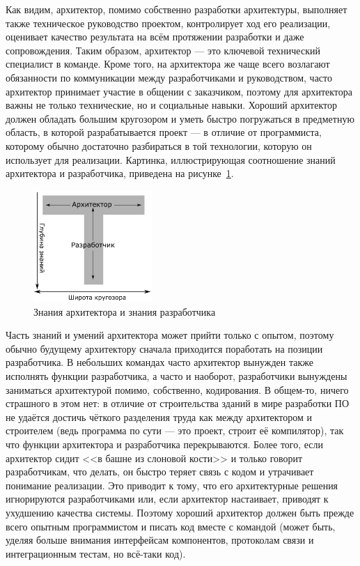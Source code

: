 \documentclass[a5paper]{article}
\begin{document}
Как видим, архитектор, помимо собственно разработки архитектуры, выполняет также техническое руководство проектом, контролирует ход его реализации, оценивает качество результата на всём протяжении разработки и даже сопровождения. Таким образом, архитектор --- это ключевой технический специалист в команде. Кроме того, на архитектора же чаще всего возлагают обязанности по коммуникации между разработчиками и руководством, часто архитектор принимает участие в общении с заказчиком, поэтому для архитектора важны не только технические, но и социальные навыки. Хороший архитектор должен обладать большим кругозором и уметь быстро погружаться в предметную область, в которой разрабатывается проект --- в отличие от программиста, которому обычно достаточно разбираться в той технологии, которую он использует для реализации. Картинка, иллюстрирующая соотношение знаний архитектора и разработчика, приведена на рисунке~\ref{figure:architectVsDeveloper}.

\begin{figure}
    \begin{center}
        \includegraphics[width=0.4\textwidth]{architectVsDeveloper.png}
    \end{center}
    \caption{Знания архитектора и знания разработчика}
    \label{figure:architectVsDeveloper}
\end{figure}

Часть знаний и умений архитектора может прийти только с опытом, поэтому обычно будущему архитектору сначала приходится поработать на позиции разработчика. В небольших командах часто архитектор вынужден также исполнять функции разработчика, а часто и наоборот, разработчики вынуждены заниматься архитектурой помимо, собственно, кодирования. В общем-то, ничего страшного в этом нет: в отличие от строительства зданий в мире разработки ПО не удаётся достичь чёткого разделения труда как между архитектором и строителем (ведь программа по сути --- это проект, строит её компилятор), так что функции архитектора и разработчика перекрываются. Более того, если архитектор сидит <<в башне из слоновой кости>> и только говорит разработчикам, что делать, он быстро теряет связь с кодом и утрачивает понимание реализации. Это приводит к тому, что его архитектурные решения игнорируются разработчиками или, если архитектор настаивает, приводят к ухудшению качества системы. Поэтому хороший архитектор должен быть прежде всего опытным программистом и писать код вместе с командой (может быть, уделяя больше внимания интерфейсам компонентов, протоколам связи и интеграционным тестам, но всё-таки код). 
\end{document}
